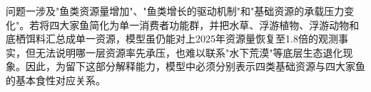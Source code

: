 问题一涉及"鱼类资源量增加"、"鱼类增长的驱动机制"和"基础资源的承载压力变化"。若将四大家鱼简化为单一消费者功能群，并把水草、浮游植物、浮游动物和底栖饵料汇总成单一资源，模型虽仍能对上2025年资源量恢复至1.8倍的观测事实，但无法说明哪一层资源率先承压，也难以联系"水下荒漠"等底层生态退化现象。因此，为留下这部分解释能力，模型中必须分别表示四类基础资源与四大家鱼的基本食性对应关系。

